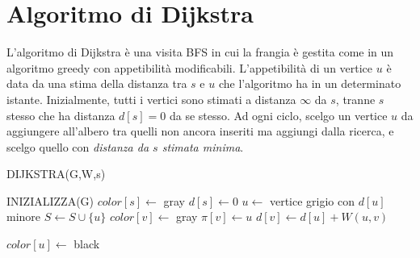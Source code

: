 \documentclass[11pt]{book}
\begin{document}
\section{Algoritmo di Dijkstra}
L'algoritmo di Dijkstra è una visita BFS in cui la frangia è gestita come in un algoritmo greedy con appetibilità modificabili.
L'appetibilità di un vertice $u$ è data da una stima della distanza tra $s$ e $u$ che l'algoritmo ha in un determinato istante.
Inizialmente, tutti i vertici sono stimati a distanza $\infty$ da $s$, tranne $s$ stesso che ha distanza $d[s]=0$ da se 
stesso. Ad ogni ciclo, scelgo un vertice $u$ da aggiungere all'albero tra quelli non ancora inseriti ma aggiungi dalla 
ricerca, e scelgo quello con \textit{distanza da $s$ stimata minima}.
\begin{algorithm}[H]
    \caption{DIJKSTRA(G,W,s)}
    \begin{algorithmic}
        \State INIZIALIZZA(G)
        \State $color[s]\gets$ gray
        \State $d[s]\gets 0$
            \State $u\gets$ vertice grigio con $d[u]$ minore
            \State $S\gets S\cup\{u\}$
                    \State $color[v]\gets$ gray 
                        \State $\pi[v]\gets u$
                        \State $d[v]\gets d[u]+W(u,v)$
                    \EndIf
                \EndIf 
            \EndFor 
    \end{algorithmic}
\end{algorithm}
\begin{algorithm}[t]
    \begin{algorithmic}
            \State $color[u]\gets$ black
        \EndWhile
    \end{algorithmic}
\end{algorithm}
\end{document}
